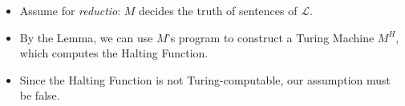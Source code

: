 \documentclass[12pt]{extarticle}
\begin{document}
\begin{itemize}

\item {Assume for \emph{reductio}:} \(M\) decides the truth of sentences of $\mathcal{L}$.

\item By the Lemma, we can use $M$'s program to construct a Turing Machine \(M^H\), which computes the Halting Function.

\item Since the Halting Function is not Turing-computable, our assumption must be false.


\end{itemize}
\end{document}
